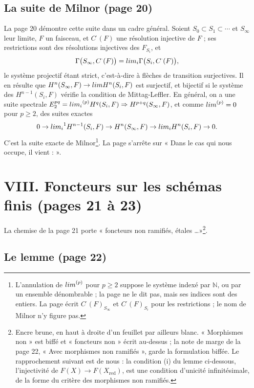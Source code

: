 \documentclass[11pt,a4paper]{article}
\begin{document}
\subsection*{La suite de Milnor (page 20)}

La page 20 démontre cette suite dans un cadre général. Soient $S_0 \subset
S_1 \subset \cdots$ et $S_\infty$ leur limite, $F$ un faisceau, et
$C^{\cdot}(F)$ une résolution injective de $F$ ; ses restrictions sont des
résolutions injectives des $F_{S_i}$, et
\[
  \Gamma\bigl(S_\infty, C^{\cdot}(F)\bigr) = \varprojlim_i
  \Gamma\bigl(S_i, C^{\cdot}(F)\bigr) ,
\]
le système projectif étant strict, c'est-à-dire à flèches de transition
surjectives. Il en résulte que $H^n(S_\infty, F) \to \varprojlim H^n(S_i, F)$
est surjectif, et bijectif si le système des $H^{n-1}(S_i, F)$ vérifie la
condition de Mittag-Leffler. En général, on a une suite spectrale
$E_2^{pq} = {\varprojlim_i}^{(p)} H^q(S_i, F) \Rightarrow H^{p+q}(S_\infty,
F)$, et comme ${\varprojlim}^{(p)} = 0$ pour $p \geqslant 2$, des suites exactes
\[
  0 \to {\varprojlim_i}^{1} H^{n-1}(S_i, F) \to H^n(S_\infty, F) \to
  \varprojlim_i H^n(S_i, F) \to 0 .
\]
C'est la suite exacte de Milnor\footnote{L'annulation de
${\varprojlim}^{(p)}$ pour $p \geqslant 2$ suppose le système indexé par
$\mathbb{N}$, ou par un ensemble dénombrable ; la page ne le dit pas, mais ses
indices sont des entiers. La page écrit $C^{\cdot}(F)_{S_\infty}$ et
$C^{\cdot}(F)_{S_i}$ pour les restrictions ; le nom de Milnor n'y figure
pas.}. La page s'arrête sur « Dans le cas qui nous occupe, il vient : ».

\section*{VIII. Foncteurs sur les schémas finis (pages 21 à 23)}

La chemise de la page 21 porte « foncteurs non ramifiés, étales
\ldots »\footnote{Encre brune, en haut à droite d'un feuillet par ailleurs
blanc. « Morphismes non » est biffé et « foncteurs non » écrit au-dessus ; la
note de marge de la page 22, « Avec morphismes non ramifiés », garde la
formulation biffée. Le rapprochement suivant est de nous : la condition (i)
du lemme ci-dessous, l'injectivité de $F(X) \to F(X_{\mathrm{red}})$, est
une condition d'unicité infinitésimale, de la forme du critère des morphismes
non ramifiés.}.

\subsection*{Le lemme (page 22)}
\end{document}
